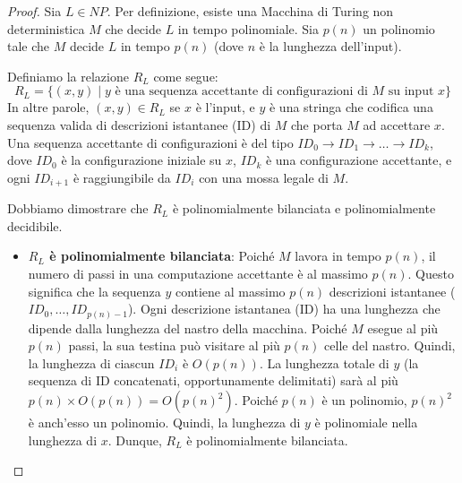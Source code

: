 \documentclass[a4paper]{article}
\begin{document}
\begin{proof}
Sia $L \in NP$. Per definizione, esiste una Macchina di Turing non deterministica $M$ che decide $L$ in tempo polinomiale. Sia $p(n)$ un polinomio tale che $M$ decide $L$ in tempo $p(n)$ (dove $n$ è la lunghezza dell'input).

Definiamo la relazione $R_L$ come segue:
\[ R_L = \{(x, y) \mid y \text{ è una sequenza accettante di configurazioni di } M \text{ su input } x \} \]
In altre parole, $(x, y) \in R_L$ se $x$ è l'input, e $y$ è una stringa che codifica una sequenza valida di descrizioni istantanee (ID) di $M$ che porta $M$ ad accettare $x$. Una sequenza accettante di configurazioni è del tipo $ID_0 \to ID_1 \to \dots \to ID_k$, dove $ID_0$ è la configurazione iniziale su $x$, $ID_k$ è una configurazione accettante, e ogni $ID_{i+1}$ è raggiungibile da $ID_i$ con una mossa legale di $M$.

Dobbiamo dimostrare che $R_L$ è polinomialmente bilanciata e polinomialmente decidibile.

\begin{itemize}
    \item \textbf{$R_L$ è polinomialmente bilanciata}:
    Poiché $M$ lavora in tempo $p(n)$, il numero di passi in una computazione accettante è al massimo $p(n)$. Questo significa che la sequenza $y$ contiene al massimo $p(n)$ descrizioni istantanee ($ID_0, \dots, ID_{p(n)-1}$).
    Ogni descrizione istantanea (ID) ha una lunghezza che dipende dalla lunghezza del nastro della macchina. Poiché $M$ esegue al più $p(n)$ passi, la sua testina può visitare al più $p(n)$ celle del nastro. Quindi, la lunghezza di ciascun $ID_i$ è $O(p(n))$.
    La lunghezza totale di $y$ (la sequenza di ID concatenati, opportunamente delimitati) sarà al più $p(n) \times O(p(n)) = O(p(n)^2)$. Poiché $p(n)$ è un polinomio, $p(n)^2$ è anch'esso un polinomio. Quindi, la lunghezza di $y$ è polinomiale nella lunghezza di $x$. Dunque, $R_L$ è polinomialmente bilanciata.


\end{itemize}
\end{proof}
\end{document}
